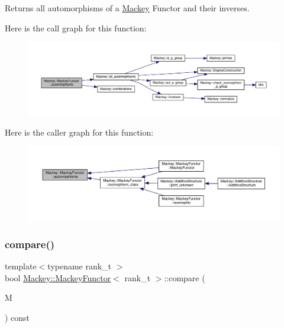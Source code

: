Returns all automorphisms of a \hyperlink{namespaceMackey}{Mackey} Functor and their inverses. 

Here is the call graph for this function\+:\nopagebreak
\begin{figure}[H]
\begin{center}
\leavevmode
\includegraphics[width=350pt]{classMackey_1_1MackeyFunctor_a454e5488d62aa1e8d5ff4df71aeecfa1_cgraph}
\end{center}
\end{figure}
Here is the caller graph for this function\+:\nopagebreak
\begin{figure}[H]
\begin{center}
\leavevmode
\includegraphics[width=350pt]{classMackey_1_1MackeyFunctor_a454e5488d62aa1e8d5ff4df71aeecfa1_icgraph}
\end{center}
\end{figure}
\mbox{\label{classMackey_1_1MackeyFunctor_a001f4a56e79e68ca3fef808e6b0ccca4}} 
\subsubsection{\texorpdfstring{compare()}{compare()}}
{\footnotesize\ttfamily template$<$typename rank\+\_\+t $>$ \\
bool \hyperlink{classMackey_1_1MackeyFunctor}{Mackey\+::\+Mackey\+Functor}$<$ rank\+\_\+t $>$\+::compare (\begin{DoxyParamCaption}\item[{const \hyperlink{classMackey_1_1MackeyFunctor}{Mackey\+Functor}$<$ rank\+\_\+t $>$ \&}]{M }\end{DoxyParamCaption}) const}




